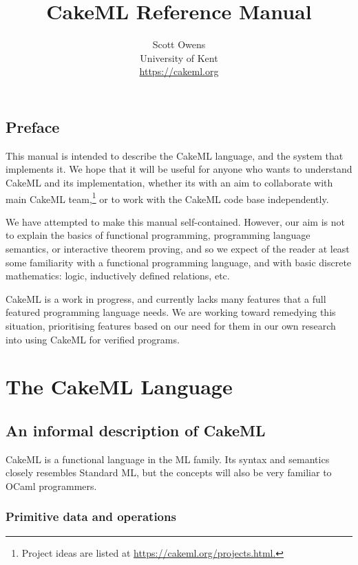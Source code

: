 \documentclass[12pt,a4paper]{book}
\title{CakeML Reference Manual}
\author{Scott Owens\\
University of Kent\\
\url{https://cakeml.org}
}
\begin{document}
\sloppy
\maketitle

\frontmatter

\chapter{Preface}

This manual is intended to describe the CakeML language, and the system that implements it. We hope that it will be useful for anyone who wants to understand  CakeML and its implementation, whether its with an aim to collaborate with main CakeML team,\footnote{Project ideas are listed at \url{https://cakeml.org/projects.html.}}
or to work with the CakeML code base independently.

We have attempted to make this manual self-contained. However, our aim is not to explain the basics of functional programming, programming language semantics, or interactive theorem proving, and so we expect of the reader at least some familiarity with a functional programming language, and with basic discrete mathematics: logic, inductively defined relations, etc.

CakeML is a work in progress, and currently lacks many features that a full featured programming language needs. We are working toward remedying this situation, prioritising features based on our need for them in our own research into using CakeML for verified programs.

\mainmatter
\tableofcontents


\part{The CakeML Language}

\chapter{An informal description of CakeML}

CakeML is a functional language in the ML family. Its syntax and semantics closely resembles Standard ML, but the concepts will also be very familiar to OCaml programmers.

\section{Primitive data and operations}
\end{document}
